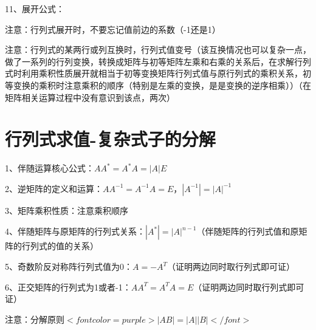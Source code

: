 11、展开公式：

注意：行列式展开时，不要忘记值前边的系数（-1还是1）

注意：行列式的某两行或列互换时，行列式值变号（该互换情况也可以复杂一点，做了一系列的行列变换，转换成矩阵与初等矩阵左乘和右乘的关系后，在求解行列式时利用乘积性质展开就相当于初等变换矩阵行列式值与原行列式的乘积关系，初等变换的乘积时注意乘积的顺序（特别是左乘的变换，是是变换的逆序相乘））（在矩阵相关运算过程中没有意识到该点，两次）

\section{行列式求值-复杂式子的分解}

1、伴随运算核心公式：$ AA^*=A^*A=|A|E $

2、逆矩阵的定义和运算：$ AA^{-1}=A^{-1}A=E $，$ |A^{-1}|=|A|^{-1} $

3、矩阵乘积性质：注意乘积顺序

4、伴随矩阵与原矩阵的行列式关系：$ |A^*|=|A|^{n-1} $（伴随矩阵的行列式值和原矩阵的行列式的值的关系）

5、奇数阶反对称阵行列式值为0：$ A=-A^T $（证明两边同时取行列式即可证）

6、正交矩阵的行列式为1或者-1：$ AA^T=A^TA=E $（证明两边同时取行列式即可证）

注意：分解原则$ <font color=purple>|AB|=|A||B|</font> $

